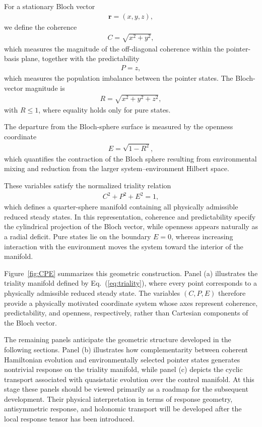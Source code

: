 For a stationary Bloch vector
\begin{align}
\mathbf{r}
=
(x,y,z),
\end{align}
we define the coherence
\begin{align}
C
=
\sqrt{x^2+y^2},
\end{align}
which measures the magnitude of the off-diagonal
coherence within the pointer-basis plane, together with
the predictability
\begin{align}
P
=
z,
\end{align}
which measures the population imbalance between the
pointer states. The Bloch-vector magnitude is
\begin{align}
R
=
\sqrt{x^2+y^2+z^2},
\end{align}
with $R\le1$, where equality holds only for pure states.

The departure from the Bloch-sphere surface is measured
by the openness coordinate
\begin{align}
E
=
\sqrt{1-R^2},
\end{align}
which quantifies the contraction of the Bloch sphere
resulting from environmental mixing and reduction from
the larger system--environment Hilbert space.

These variables satisfy the normalized triality relation
\begin{align}
C^2+P^2+E^2=1,
\label{eq:triality}
\end{align}
which defines a quarter-sphere manifold containing all
physically admissible reduced steady states. In this
representation, coherence and predictability specify the
cylindrical projection of the Bloch vector, while
openness appears naturally as a radial deficit. Pure
states lie on the boundary $E=0$, whereas increasing
interaction with the environment moves the system
toward the interior of the manifold.



Figure~\ref{fig:CPE} summarizes this geometric
construction. Panel (a) illustrates the triality
manifold defined by Eq.~(\ref{eq:triality}), where every
point corresponds to a physically admissible reduced
steady state. The variables $(C,P,E)$ therefore provide
a physically motivated coordinate system whose axes
represent coherence, predictability, and openness,
respectively, rather than Cartesian components of the
Bloch vector.


The remaining panels anticipate the geometric structure
developed in the following sections. Panel (b)
illustrates how complementarity between coherent
Hamiltonian evolution and environmentally selected
pointer states generates nontrivial response on the
triality manifold, while panel (c) depicts the cyclic
transport associated with quasistatic evolution over the
control manifold. At this stage these panels should be
viewed primarily as a roadmap for the subsequent
development. Their physical interpretation in terms of
response geometry, antisymmetric response, and
holonomic transport will be developed after the local
response tensor has been introduced.

